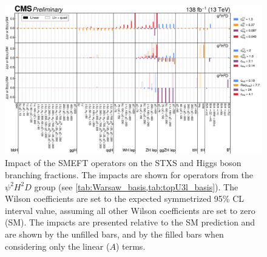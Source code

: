 \begin{landscape}
  \begin{figure}
    \centering
    \includegraphics[width=\pagewidth]{Figures/EFT/HIG-21-018-Figure_015.pdf}
    \caption[Impact of SMEFT Operators in the SMEFT Basis (2)]{Impact of the SMEFT operators on the STXS and Higgs boson branching fractions. The impacts are shown for operators from the $\psi^2H^2D$ group (see \cref{tab:Warsaw_basis,tab:topU3l_basis}). The Wilson coefficients are set to the expected symmetrized 95\% CL interval value, assuming all other Wilson coefficients are set to zero (SM). The impacts are presented relative to the SM prediction and are shown by the unfilled bars, and by the filled bars when considering only the linear ($A$) terms.}\label{fig:smeft_parametrisation_part2}
  \end{figure}
\end{landscape}

